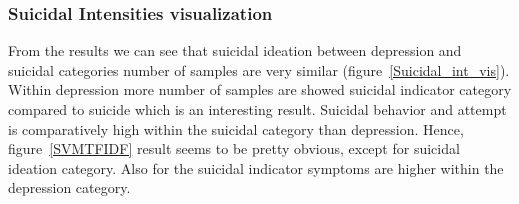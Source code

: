 \documentclass[sn-mathphys,Numbered]{sn-jnl}%
\theoremstyle{thmstyleone}%
\theoremstyle{thmstyletwo}%
\theoremstyle{thmstylethree}%
\begin{document}


\subsubsection{Suicidal Intensities visualization}
From the results we can see that suicidal ideation between depression and suicidal categories number of samples are very similar (figure~\ref{Suicidal_int_vis}). Within depression more number of samples are showed suicidal indicator category compared to suicide which is an interesting result. Suicidal behavior and attempt is comparatively high within the suicidal category than depression. Hence, figure~\ref{SVMTFIDF} result seems to be pretty obvious, except for suicidal ideation category. Also for the suicidal indicator symptoms are higher within the depression category. 
\end{document}
